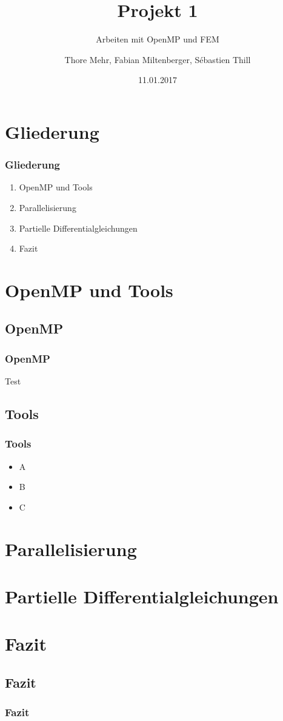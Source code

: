 \documentclass[german,notes,18pt]{beamer}
\title{Projekt 1}
\subtitle{Arbeiten mit OpenMP und FEM}
\author{Thore Mehr, Fabian Miltenberger, Sébastien Thill}
\date{11.01.2017}
\institute{Lehrstuhl für Rechnerarchitektur und Parallelverarbeitung (ITEC)}
\begin{document}
	
	\frame{\titlepage}
	
	\section{Gliederung}
	\begin{frame}
		\frametitle{Gliederung}
		
		\begin{enumerate}
			\item OpenMP und Tools
			\item Parallelisierung
			\item Partielle Differentialgleichungen
			\item Fazit
		\end{enumerate}
	\end{frame}

	\section{OpenMP und Tools}
	\subsection{OpenMP}
	\begin{frame}
		\frametitle{OpenMP}
		
		Test
	\end{frame}
	\subsection{Tools}
	\begin{frame}
		\frametitle{Tools}
		
		\begin{itemize}
			\item A
			\item B
			\item C
		\end{itemize}
	\end{frame}
	
	\section{Parallelisierung}
	
	\section{Partielle Differentialgleichungen}
	
	\section{Fazit}
	\subsection{Fazit}
	\begin{frame}
		\frametitle{Fazit}
		
	\end{frame}
\end{document}

